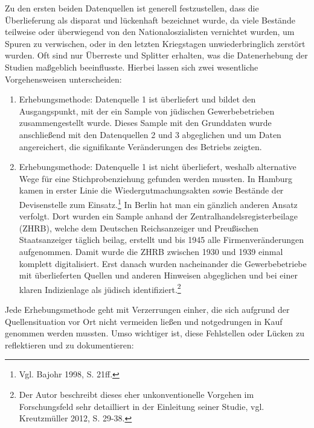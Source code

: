 Zu den ersten beiden Datenquellen ist generell festzustellen, dass die Überlieferung als disparat und lückenhaft bezeichnet wurde, da viele Bestände teilweise oder überwiegend von den Nationaloszialisten vernichtet wurden, um Spuren zu verwischen, oder in den letzten Kriegstagen unwiederbringlich zerstört wurden. Oft sind nur Überreste und Splitter erhalten, was die Datenerhebung der Studien maßgeblich beeinflusste. Hierbei lassen sich zwei wesentliche Vorgehensweisen unterscheiden:

\begin{enumerate}
    \item Erhebungsmethode: Datenquelle 1 ist überliefert und bildet den Ausgangspunkt, mit der ein Sample von jüdischen Gewerbebetrieben zusammengestellt wurde. Dieses Sample mit den Grunddaten wurde anschließend mit den Datenquellen 2 und 3 abgeglichen und um Daten angereichert, die signifikante Veränderungen des Betriebs zeigten.  
    \item Erhebungsmethode: Datenquelle 1 ist nicht überliefert, weshalb alternative Wege für eine Stichprobenziehung gefunden werden mussten. In Hamburg kamen in erster Linie die Wiedergutmachungsakten sowie Bestände der Devisenstelle zum Einsatz.\footnote{Vgl. Bajohr 1998, S. 21ff.} In Berlin hat man ein gänzlich anderen Ansatz verfolgt. Dort wurden ein Sample anhand der Zentralhandelsregisterbeilage (ZHRB), welche dem Deutschen Reichsanzeiger und Preußischen Staatsanzeiger täglich beilag, erstellt und bis 1945 alle Firmenveränderungen aufgenommen. Damit wurde die ZHRB zwischen 1930 und 1939 einmal komplett digitalisiert. Erst danach wurden nacheinander die Gewerbebetriebe mit überlieferten Quellen und anderen Hinweisen abgeglichen und bei einer klaren Indizienlage als jüdisch identifiziert.\footnote{Der Autor beschreibt dieses eher unkonventionelle Vorgehen im Forschungsfeld sehr detailliert in der Einleitung seiner Studie, vgl. Kreutzmüller 2012, S. 29-38.}
\end{enumerate}

Jede Erhebungsmethode geht mit Verzerrungen einher, die sich aufgrund der Quellensituation vor Ort nicht vermeiden ließen und notgedrungen in Kauf genommen werden mussten. Umso wichtiger ist, diese Fehlstellen oder Lücken zu reflektieren und zu dokumentieren:

